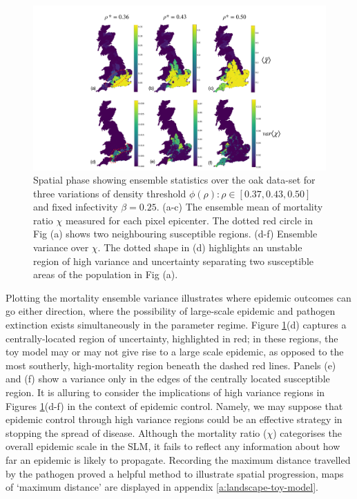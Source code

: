 \begin{figure}
    \centering
    \includegraphics[scale=0.4]{chapter4/figures/figure5.pdf}
    \caption{Spatial phase showing ensemble statistics over the oak data-set for three variations of density threshold $\phi(\rho): \rho \in [0.37, 0.43, 0.50]$ and fixed infectivity $\beta=0.25$. (a-c) The ensemble mean of mortality ratio $\chi$ measured for each pixel epicenter. The dotted red circle in Fig (a) shows two neighbouring susceptible regions. (d-f) Ensemble variance over $\chi$. The dotted shape in (d) highlights an unstable region of high variance and uncertainty separating two susceptible areas of the population in Fig (a).}
    \label{fig:oak-spatial-ensemble}
\end{figure}
Plotting the mortality ensemble variance illustrates where epidemic outcomes can go either direction, 
where the possibility of large-scale epidemic and pathogen extinction exists simultaneously in the parameter regime.
Figure \ref{fig:oak-spatial-ensemble}(d) captures a centrally-located region of uncertainty, highlighted in red; 
in these regions, the toy model may or may not give rise to a large scale epidemic, as opposed to the most southerly, 
high-mortality region beneath the dashed red lines. Panels (e) and (f) show a variance only in the edges of the centrally
located susceptible region. It is alluring to consider the implications of high variance regions in Figures \ref{fig:oak-spatial-ensemble}(d-f)
in the context of epidemic control. Namely, we may suppose that epidemic control through high variance regions could be an effective strategy
in stopping the spread of disease.
Although the mortality ratio ($\chi$) categorises the overall epidemic scale in the SLM, 
it fails to reflect any information about how far an epidemic is likely to propagate.
Recording the maximum distance travelled by the pathogen proved a helpful method to illustrate spatial progression,
maps of `maximum distance' are displayed in appendix \ref{a:landscape-toy-model}. 


